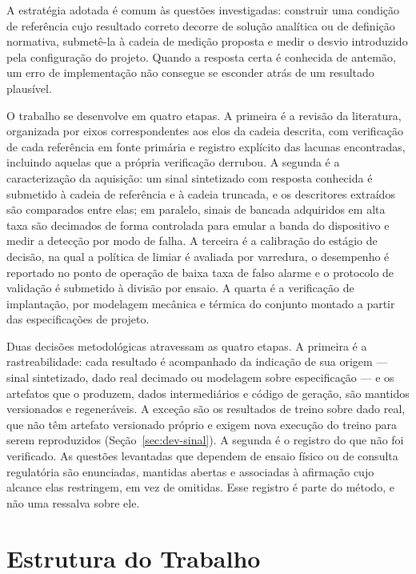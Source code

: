 A estratégia adotada é comum às questões investigadas: construir uma condição de
referência cujo resultado correto decorre de solução analítica ou de definição normativa,
submetê-la à cadeia de medição proposta e medir o desvio introduzido pela configuração do
projeto. Quando a resposta certa é conhecida de antemão, um erro de implementação não
consegue se esconder atrás de um resultado plausível.

O trabalho se desenvolve em quatro etapas. A primeira é a revisão da literatura,
organizada por eixos correspondentes aos elos da cadeia descrita, com verificação de cada
referência em fonte primária e registro explícito das lacunas encontradas, incluindo
aquelas que a própria verificação derrubou. A segunda é a caracterização da aquisição: um sinal
sintetizado com resposta conhecida é submetido à cadeia de referência e à cadeia truncada, e
os descritores extraídos são comparados entre elas; em paralelo, sinais de bancada
adquiridos em alta taxa são decimados de forma controlada para emular a banda do
dispositivo e medir a detecção por modo de falha.
A terceira é a calibração do estágio de decisão, na qual a política de limiar é avaliada
por varredura, o desempenho é reportado no ponto de operação de baixa taxa de falso alarme
e o protocolo de validação é submetido à divisão por ensaio. A quarta é a verificação de
implantação, por modelagem mecânica e térmica do conjunto montado a partir das
especificações de projeto.

Duas decisões metodológicas atravessam as quatro etapas. A primeira é a rastreabilidade:
cada resultado é acompanhado da indicação de sua origem --- sinal sintetizado, dado real
decimado ou modelagem sobre especificação --- e os artefatos que o produzem, dados
intermediários e código de geração, são mantidos versionados e regeneráveis. A exceção são
os resultados de treino sobre dado real, que não têm artefato versionado próprio e exigem
nova execução do treino para serem reproduzidos (Seção~\ref{sec:dev-sinal}). A
segunda é o registro do que não foi verificado. As questões levantadas que dependem de
ensaio físico ou de consulta regulatória são enunciadas, mantidas abertas e associadas à
afirmação cujo alcance elas restringem, em vez de omitidas. Esse registro é parte do
método, e não uma ressalva sobre ele.

\section{Estrutura do Trabalho}
\label{sec:estrutura}

